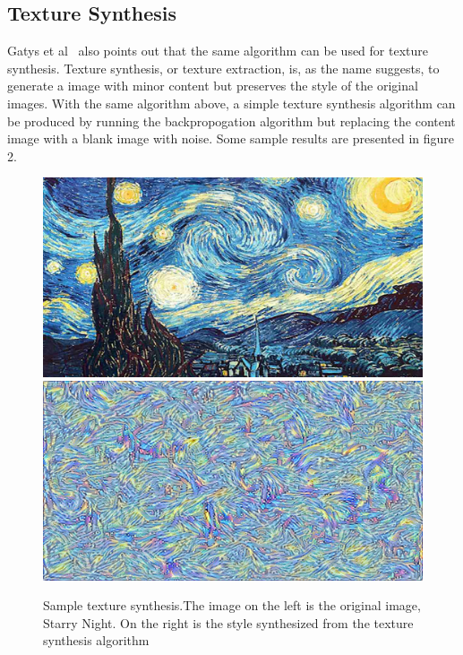 \documentclass[10pt,twocolumn,letterpaper]{article}
\begin{document}
\subsection{Texture Synthesis}
Gatys et al~\cite{Gatys2} also points out that the same algorithm can be used for texture synthesis. Texture synthesis, or texture extraction, is, as the name suggests, to generate a image with minor content but preserves the style of the original images. With the same algorithm above, a simple texture synthesis algorithm can be produced by running the backpropogation algorithm but replacing the content image with a blank image with noise. Some sample results are presented in figure 2.
\begin{figure}[t]
\begin{center}
   \includegraphics[width=0.45\linewidth]{starry_night.jpg} \includegraphics[width=0.45\linewidth]{starry_night_style.jpg}	
\end{center}
   \caption{Sample texture synthesis.The image on the left is the original image, Starry Night. On the right is the style synthesized from the texture synthesis algorithm}
\label{fig:long}
\label{fig:onecol}
\end{figure}
\end{document}

